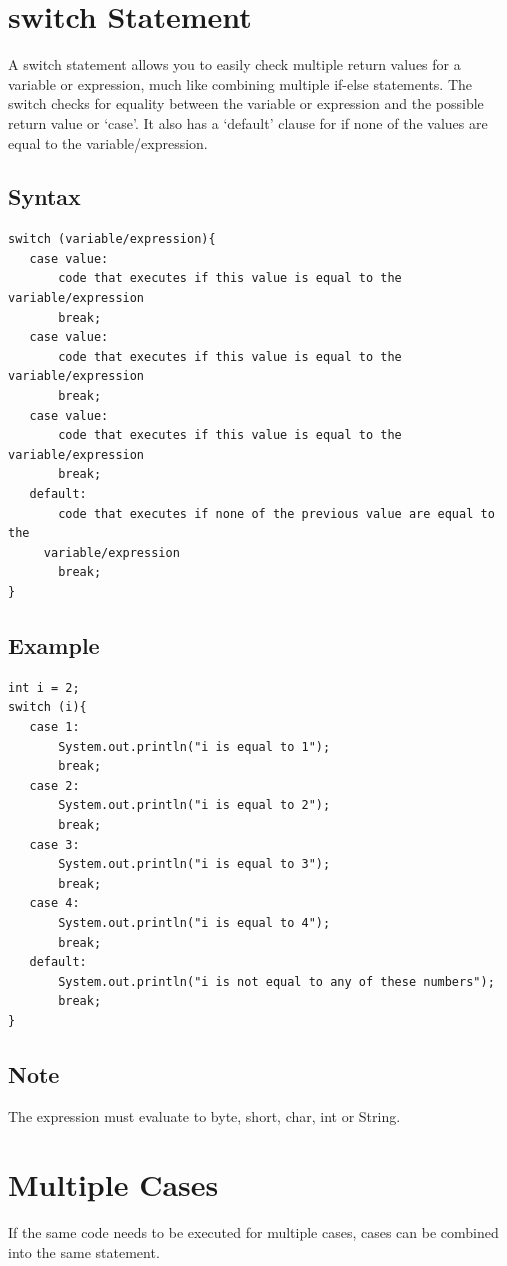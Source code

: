 \documentclass[a4paper]{article}
\begin{document}
\section*{switch Statement}
A switch statement allows you to easily check multiple return values for a
variable or expression, much like combining multiple if-else statements.
The switch checks for equality between the variable or expression and the
possible return value or ‘case’. It also has a ‘default’ clause for if none of
the values are equal to the variable/expression.

\subsection*{Syntax}
\begin{lstlisting}
switch (variable/expression){
   case value:
       code that executes if this value is equal to the variable/expression
       break;
   case value:
       code that executes if this value is equal to the variable/expression
       break;
   case value:
       code that executes if this value is equal to the variable/expression
       break;
   default:
       code that executes if none of the previous value are equal to the
     variable/expression
       break;
}
\end{lstlisting}

\subsection*{Example}
\begin{lstlisting}
int i = 2;
switch (i){
   case 1:
       System.out.println("i is equal to 1");
       break;
   case 2:
       System.out.println("i is equal to 2");
       break;
   case 3:
       System.out.println("i is equal to 3");
       break;
   case 4:
       System.out.println("i is equal to 4");
       break;
   default:
       System.out.println("i is not equal to any of these numbers");
       break;
}
\end{lstlisting}

\subsection*{Note}
The expression must evaluate to byte, short, char, int or String.

\section*{Multiple Cases}
If the same code needs to be executed for multiple cases, cases can be combined
into the same statement.
\end{document}
